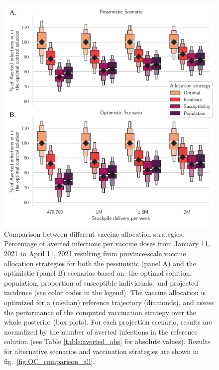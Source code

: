 \begin{figure}[!ht]
    \centering
    \includegraphics[width=\textwidth]{fig_italy-ocp/figures/scenarios_perturb_all.pdf}
    \caption[Comparison between different vaccine allocation strategies]{Comparison between different vaccine allocation strategies. Percentage of averted infections per vaccine doses from January 11, 2021 to April 11, 2021 resulting from province-scale vaccine allocation strategies for both the pessimistic (panel A) and the optimistic (panel B) scenarios based on: the optimal solution, population, proportion of susceptible individuals, and projected incidence (see color codes in the legend). The vaccine allocation is optimized for a (median) reference trajectory (diamonds), and assess the performance of the computed vaccination strategy over the whole posterior (box plots). For each projection scenario, results are normalized by the number of averted infections in the reference solution (see Table \ref{table:averted_abs} for absolute values). Results for alternative scenarios and vaccination strategies are shown in fig.~\ref{fig:OC_comparison_all}.}
    \label{fig:OC_comparison}
\end{figure}
